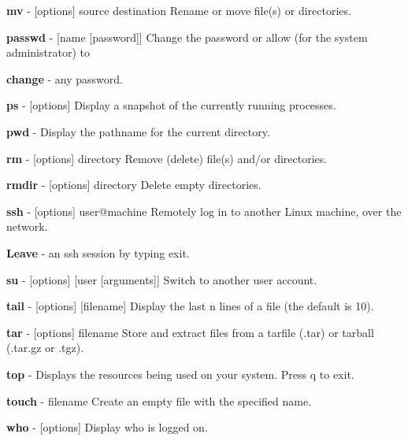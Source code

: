 {\bfseries{mv}} -\/ \mbox{[}options\mbox{]} source destination Rename or move file(s) or directories.

{\bfseries{passwd}} -\/ \mbox{[}name \mbox{[}password\mbox{]}\mbox{]} Change the password or allow (for the system administrator) to

{\bfseries{change}} -\/ any password.

{\bfseries{ps}} -\/ \mbox{[}options\mbox{]} Display a snapshot of the currently running processes.

{\bfseries{pwd}} -\/ Display the pathname for the current directory.

{\bfseries{rm}} -\/ \mbox{[}options\mbox{]} directory Remove (delete) file(s) and/or directories.

{\bfseries{rmdir}} -\/ \mbox{[}options\mbox{]} directory Delete empty directories.

{\bfseries{ssh}} -\/ \mbox{[}options\mbox{]} user@machine Remotely log in to another Linux machine, over the network.

{\bfseries{Leave}} -\/ an ssh session by typing exit.

{\bfseries{su}} -\/ \mbox{[}options\mbox{]} \mbox{[}user \mbox{[}arguments\mbox{]}\mbox{]} Switch to another user account.

{\bfseries{tail}} -\/ \mbox{[}options\mbox{]} \mbox{[}filename\mbox{]} Display the last n lines of a file (the default is 10).

{\bfseries{tar}} -\/ \mbox{[}options\mbox{]} filename Store and extract files from a tarfile (.tar) or tarball (.tar.\+gz or .tgz).

{\bfseries{top}} -\/ Displays the resources being used on your system. Press q to exit.

{\bfseries{touch}} -\/ filename Create an empty file with the specified name.

{\bfseries{who}} -\/ \mbox{[}options\mbox{]} Display who is logged on. 